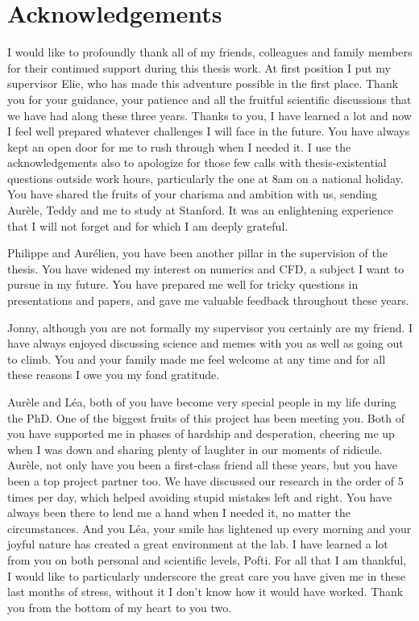 \chapter*{Acknowledgements}
I would like to profoundly thank all of my friends, colleagues and family members for their continued support during this thesis work. At first position I put my supervisor Elie, who has made this adventure possible in the first place. Thank you for your guidance, your patience and all the fruitful scientific discussions that we have had along these three years. Thanks to you, I have learned a lot and now I feel well prepared whatever challenges I will face in the future. You have always kept an open door for me to rush through when I needed it. I use the acknowledgements also to apologize for those few calls with thesis-existential questions outside work hours, particularly the one at 8am on a national holiday. You have shared the fruits of your charisma and ambition with us, sending Aurèle, Teddy and me to study at Stanford. It was an enlightening experience that I will not forget and for which I am deeply grateful.

Philippe and Aurélien, you have been another pillar in the supervision of the thesis. You have widened my interest on numerics and CFD, a subject I want to pursue in my future. You have prepared me well for tricky questions in presentations and papers, and gave me valuable feedback throughout these years.

Jonny, although you are not formally my supervisor you certainly are my friend. I have always enjoyed discussing science and memes with you as well as going out to climb. You and your family made me feel welcome at any time and for all these reasons I owe you my fond gratitude. 

Aurèle and Léa, both of you have become very special people in my life during the PhD. One of the biggest fruits of this project has been meeting you. Both of you have supported me in phases of hardship and desperation, cheering me up when I was down and sharing plenty of laughter in our moments of ridicule. Aurèle, not only have you been a first-class friend all these years, but you have been a top project partner too. We have discussed our research in the order of 5 times per day, which helped avoiding stupid mistakes left and right. You have always been there to lend me a hand when I needed it, no matter the circumstances. And you Léa, your smile has lightened up every morning and your joyful nature has created a great environment at the lab. I have learned a lot from you on both personal and scientific levels, Pofti. For all that I am thankful, I would like to particularly underscore the great care you have given me in these last months of stress, without it I don't know how it would have worked. Thank you from the bottom of my heart to you two.


